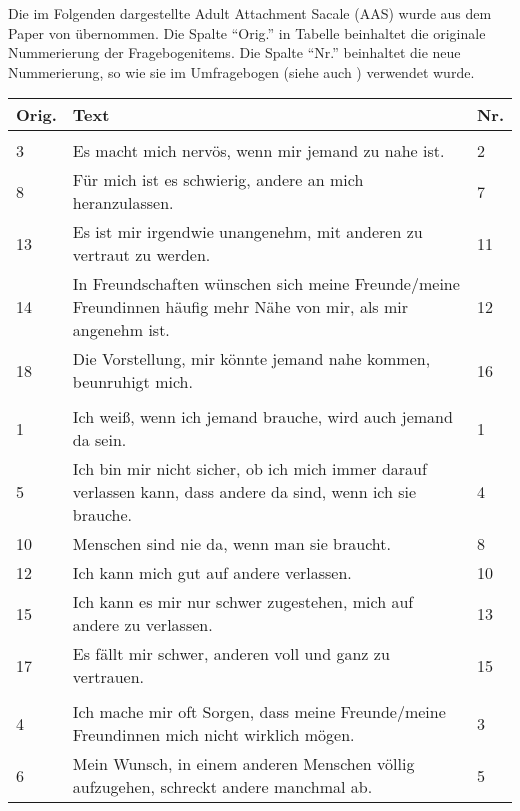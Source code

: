 Die im Folgenden dargestellte Adult Attachment Sacale (AAS) wurde aus dem Paper von  übernommen. Die Spalte \enquote{Orig.} in Tabelle  beinhaltet die originale Nummerierung der Fragebogenitems. Die Spalte \enquote{Nr.} beinhaltet die neue Nummerierung, so wie sie im Umfragebogen (siehe auch ) verwendet wurde.


\begin{table}[htbp]
\begin{tabular}{|p{2em} m{30em}  l|} 
  \hline
  \textbf{Orig.} & \textbf{Text} & \textbf{Nr.} \\ 
  \hline\hline
  \rowcolor{lightgray}
  \multicolumn{3}{|l|}{Nähe*}\\
  \hline
  3 & Es macht mich nervös, wenn mir jemand zu nahe ist. & 2 \\
  8 & Für mich ist es schwierig, andere an mich heranzulassen. & 7 \\
  13 & Es ist mir irgendwie unangenehm, mit anderen zu vertraut zu werden. & 11 \\
  14 & In Freundschaften wünschen sich meine Freunde/meine Freundinnen häufig mehr Nähe von mir, als mir angenehm ist. & 12 \\
  18 & Die Vorstellung, mir könnte jemand nahe kommen, beunruhigt mich. & 16 \\
  \hline
  \rowcolor{lightgray} \multicolumn{3}{|l|}{Vertrauen}\\
  \hline
  1 & Ich weiß, wenn ich jemand brauche, wird auch jemand da sein. & 1 \\
  5 & Ich bin mir nicht sicher, ob ich mich immer darauf verlassen kann, dass andere da sind, wenn ich sie brauche. & 4\\
  10 & Menschen sind nie da, wenn man sie braucht. & 8 \\
  12 & Ich kann mich gut auf andere verlassen. & 10\\
  15 & Ich kann es mir nur schwer zugestehen, mich auf andere zu verlassen. & 13\\
  17 & Es fällt mir schwer, anderen voll und ganz zu vertrauen. & 15\\
  \hline
  \rowcolor{lightgray} \multicolumn{3}{|l|}{Angst}\\
  \hline
  4 & Ich mache mir oft Sorgen, dass meine Freunde/meine Freundinnen mich nicht wirklich mögen. & 3\\
  6 & Mein Wunsch, in einem anderen Menschen völlig aufzugehen, schreckt andere manchmal ab. & 5 \\

\end{tabular}
\end{table}
